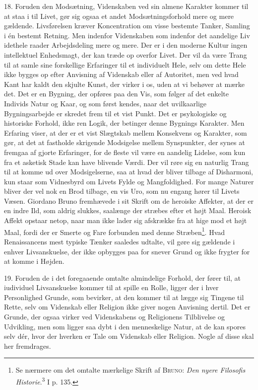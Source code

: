 \documentclass[12pt]{article}
\newcommand{\opage}[1]{\marginnote{\footnotesize\textit{[#1]}}}
\begin{document}
18. Foruden den Modsætning, Videnskaben ved sin almene Karakter kommer
til at staa i til Livet, gør sig ogsaa et andet Modsætningsforhold mere
og mere gældende. Livsførelsen kræver Koncentration om visse bestemte
Tanker, Samling i én bestemt Retning. Men indenfor Videnskaben som
indenfor det aandelige Liv
idethele raader Arbejdsdeling mere og mere. Der er i den
moderne Kultur ingen intellektuel Enhedsmagt, der kan træde op overfor
Livet. Der vil da være Trang til at samle sine forskellige Erfaringer
til et individuelt Hele, selv om dette Hele ikke bygges op efter
Anvisning af Videnskab eller af Autoritet, men ved hvad Kant har kaldt
\guillemotright{}den skjulte Kunst\guillemotleft{}, der virker i os, uden at vi behøver at mærke
det. Det er en Bygning, der opføres paa den Vis, som følger af det
enkelte Individs Natur og Kaar, og som først kendes, naar det
uvilkaarlige Bygningsarbejde er skredet frem til et vist Punkt. Det er
psykologiske og historiske Forhold, ikke ren Logik, der betinger denne
Bygnings Karakter. Men Erfaring viser, at der er et vist Slægtskab
mellem Konsekvens og Karakter, som gør, at det at fastholde skrigende
Modsigelse mellem Synspunkter, der synes at fremgaa af gjorte
Erfaringer, for de fleste vil være en aandelig Lidelse, som kun fra et
asketisk Stade kan have blivende Værdi. Der vil røre sig en naturlig
Trang til at komme ud over Modsigelserne, saa at hvad der bliver
tilbage af Disharmoni, kun staar som Vidnesbyrd om Livets
\setcounter{footnote}{0}%
\opage{55}Fylde og Mangfoldighed. For mange Naturer bliver der vel nok en
Brod tilbage, en vis Uro, som nu engang hører til Livets Væsen.
Giordano Bruno fremhævede i sit Skrift \guillemotright{}om de heroiske Affekter\guillemotleft{}, at
der er en indre Ild, som aldrig slukkes, saalænge der stræbes efter et
højt Maal. Heroisk Affekt opstaar netop, naar man ikke lader sig
afskrække fra at hige mod et højt Maal, fordi der er Smerte og Fare
forbunden med denne Stræben\footnote{Se nærmere om det omtalte
mærkelige Skrift af \textsc{Bruno}: \textit{Den nyere Filosofis
Historie}.\textsuperscript{3} I p. 135.}. Hvad Renaissancens mest
typiske Tænker saaledes udtalte, vil gøre sig gældende i enhver
Livsanskuelse, der ikke opbygges paa for snever Grund og ikke frygter
for at komme i Højden.

19. Foruden de i det foregaaende omtalte almindelige Forhold, der
fører til, at
iudividuel Livsanskuelse kommer til at spille en Rolle, ligger
der i hver Personlighed Grunde, som bevirker, at den kommer til at
lægge sig Tingene til Rette, selv om Videnskab eller Religion ikke
giver nogen Anvisning dertil. Det er Grunde, der ogsaa virker ved
Videnskabens og Religionens Tilblivelse og Udvikling, men som ligger
saa dybt i den menneskelige Natur, at de kan spores selv dér, hvor der
hverken er Tale om Videnskab eller Religion. Nogle af disse skal her
fremdrages.
\end{document}
